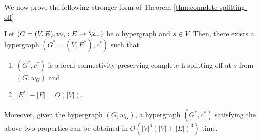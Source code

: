 We now prove the following stronger form of Theorem \ref{thm:complete-splitting-off}.
\begin{theorem}\label{thm:hypergraphs-splitting-off-stronger-form}
    Let $(G=(V, E), w_G: E\rightarrow \Z_+)$ be a hypergraph and $s\in V$. Then, there exists a hypergraph $(G^*=(V, E^*), c^*)$ such that 
    \begin{enumerate}
        \item $(G^*, c^*)$ is a local connectivity preserving complete h-splitting-off at $s$ from $(G, w_G)$ and 
        \item $|E^*|-|E|=O(|V|)$. 
    \end{enumerate}
    Moreover, given the hypergraph $(G, w_G)$, a hypergraph $(G^*, c^*)$ satisfying the above two properties can be obtained in $O(|V|^6(|V|+|E|)^3)$ time. 
\end{theorem}
